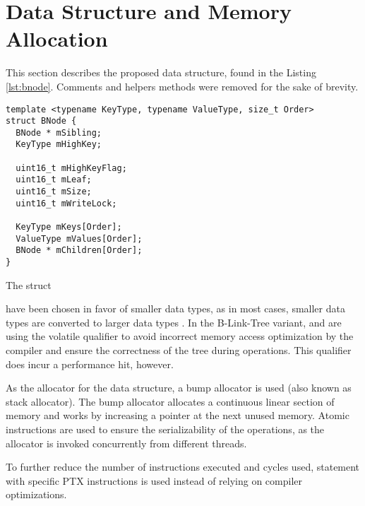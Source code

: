 \section{Data Structure and Memory Allocation}

This section describes the proposed data structure, found in the Listing \ref{lst:bnode}. Comments and helpers methods were removed for the sake of brevity.

\begin{listing}[H]
  \begin{verbatim}
template <typename KeyType, typename ValueType, size_t Order>
struct BNode {
  BNode * mSibling;
  KeyType mHighKey;

  uint16_t mHighKeyFlag;
  uint16_t mLeaf;
  uint16_t mSize;
  uint16_t mWriteLock;

  KeyType mKeys[Order];
  ValueType mValues[Order];
  BNode * mChildren[Order]; 
}
    \end{verbatim}
  \caption{The  struct}\label{lst:bnode}
\end{listing}

 have been chosen in favor of smaller data types, as in most cases, smaller data types are converted to larger data types . In the B-Link-Tree variant,  and  are using the volatile qualifier to avoid incorrect memory access optimization by the compiler and ensure the correctness of the tree during operations. This qualifier does incur a performance hit, however.

As the allocator for the data structure, a bump allocator is used (also known as stack allocator). The bump allocator allocates a continuous linear section of memory and works by increasing a pointer at the next unused memory. Atomic instructions are used to ensure the serializability of the operations, as the allocator is invoked concurrently from different threads.

To further reduce the number of instructions executed and cycles used,  statement with specific PTX instructions is used instead of relying on compiler optimizations.